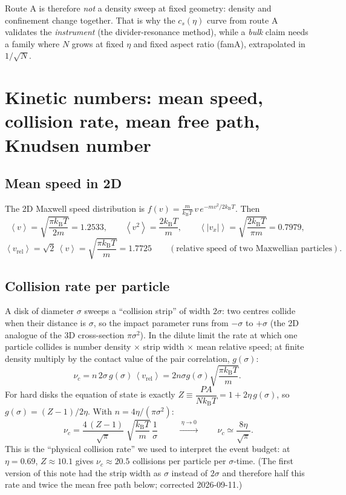 \documentclass[11pt,a4paper]{article}
\newcommand{\kT}{k_{\mathrm B}T}
\newcommand{\avg}[1]{\left\langle #1 \right\rangle}
\begin{document}
\begin{why}
Route A is therefore \emph{not} a density sweep at fixed geometry: density and confinement change together. That is why the $c_s(\eta)$ curve from route A validates the \emph{instrument} (the divider-resonance method), while a \emph{bulk} claim needs a family where $N$ grows at fixed $\eta$ and fixed aspect ratio (famA), extrapolated in $1/\sqrt N$.
\end{why}

\section{Kinetic numbers: mean speed, collision rate, mean free path, Knudsen number}

\subsection{Mean speed in 2D}
The 2D Maxwell speed distribution is $f(v) = \frac{m}{\kT}\,v\,e^{-mv^2/2\kT}$. Then
\begin{equation}
\avg{v} = \sqrt{\frac{\pi \kT}{2m}} = 1.2533,\qquad
\avg{v^2} = \frac{2\kT}{m},\qquad
\avg{|v_x|} = \sqrt{\frac{2\kT}{\pi m}} = 0.7979,
\end{equation}
\begin{equation}
\avg{v_{\mathrm{rel}}} = \sqrt2\,\avg{v} = \sqrt{\frac{\pi\kT}{m}} = 1.7725
\qquad(\text{relative speed of two Maxwellian particles}).
\end{equation}

\subsection{Collision rate per particle}
A disk of diameter $\sigma$ sweeps a ``collision strip'' of width $2\sigma$: two centres collide when their distance is $\sigma$, so the impact parameter runs from $-\sigma$ to $+\sigma$ (the 2D analogue of the 3D cross-section $\pi\sigma^2$). In the dilute limit the rate at which one particle collides is number density $\times$ strip width $\times$ mean relative speed; at finite density multiply by the contact value of the pair correlation, $g(\sigma)$:
\begin{equation}
\nu_c = n\,2\sigma\, g(\sigma)\,\avg{v_{\mathrm{rel}}}
= 2n\sigma g(\sigma)\sqrt{\frac{\pi\kT}{m}} .
\end{equation}
For hard disks the equation of state is exactly $Z \equiv \dfrac{PA}{N\kT} = 1 + 2\eta\, g(\sigma)$, so $g(\sigma) = (Z-1)/2\eta$. With $n = 4\eta/(\pi\sigma^2)$:
\begin{equation}
\boxed{\;\nu_c = \frac{4\,(Z-1)}{\sqrt\pi}\;\sqrt{\frac{\kT}{m}}\,\frac1\sigma\;}
\qquad\xrightarrow{\;\eta\to0\;}\qquad \nu_c \simeq \frac{8\eta}{\sqrt\pi}.
\label{eq:nuc}
\end{equation}
This is the ``physical collision rate'' we used to interpret the event budget: at $\eta = 0.69$, $Z \approx 10.1$ gives $\nu_c \approx 20.5$ collisions per particle per $\sigma$-time. (The first version of this note had the strip width as $\sigma$ instead of $2\sigma$ and therefore half this rate and twice the mean free path below; corrected 2026-09-11.)
\end{document}
